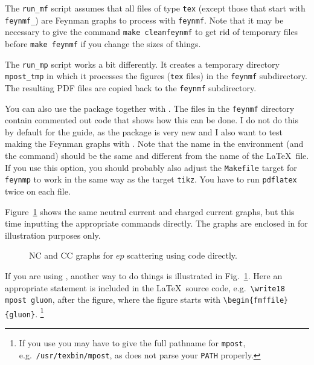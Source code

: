 The \texttt{run\_mf} script assumes that all files of type
\texttt{tex} (except those that start with \texttt{feynmf\_}) are
Feynman graphs to process with \texttt{feynmf}. Note that it may be
necessary to give the command \texttt{make cleanfeynmf} to get rid of
temporary files before \texttt{make feynmf} if you change the sizes of
things.

The \texttt{run\_mp} script works a bit differently. It creates a
temporary directory \texttt{mpost\_tmp} in which it processes the
figures (\texttt{tex} files) in the \texttt{feynmf} subdirectory. The
resulting PDF files are copied back to the \texttt{feynmf}
subdirectory.

You can also use the package  together with
. The files in the \texttt{feynmf} directory contain
commented out code that shows how this can be done. I do not do this
by default for the guide, as the package is very new and I also want
to test making the Feynman graphs with . Note that
the name in the  environment (and the 
command) should be the same and different from the name of the \LaTeX\
file. If you use this option, you should probably also adjust the
\texttt{Makefile} target for \texttt{feynmp} to work in the same way
as the target \texttt{tikz}. You have to run \texttt{pdflatex} twice
on each file.

Figure~\ref{fig:nccc-feynmf} shows the same neutral current and
charged current graphs, but this time inputting the appropriate
 commands directly. The graphs are enclosed in
 for illustration purposes only.

\begin{figure}[htbp]
  \centering
  \fbox{}
   {%
  }{
  }
  \qquad
  \fbox{}
   {%
  }{
  }
  \caption{NC and CC graphs for $ep$ scattering using 
    code directly.}
  \label{fig:nccc-feynmf}
\end{figure}

If you are using , another way to do things is
illustrated in Fig.~\ref{fig:nccc-feynmf}. Here an appropriate
 statement is included in the \LaTeX\ source code,
e.g.\ \verb+\write18 mpost gluon+, after the figure, where the figure
starts with \verb+\begin{fmffile}{gluon}+.%
\footnote{If you use \TeXstudio you may have to give the full pathname for \texttt{mpost},
  e.g.\ \texttt{/usr/texbin/mpost}, as \TeXstudio does not parse your \texttt{PATH} properly.}

